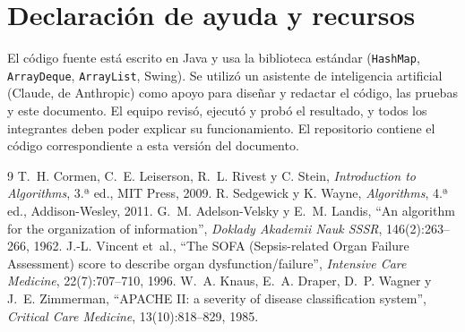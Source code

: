\documentclass[11pt,a4paper]{article}
\begin{document}
\section{Declaración de ayuda y recursos}
El código fuente está escrito en Java y usa la biblioteca estándar (\texttt{HashMap}, \texttt{ArrayDeque}, \texttt{ArrayList}, Swing). Se utilizó un asistente de inteligencia artificial (Claude, de Anthropic) como apoyo para diseñar y redactar el código, las pruebas y este documento. El equipo revisó, ejecutó y probó el resultado, y todos los integrantes deben poder explicar su funcionamiento. El repositorio contiene el código correspondiente a esta versión del documento.

\begin{thebibliography}{9}
 T.~H. Cormen, C.~E. Leiserson, R.~L. Rivest y C. Stein, \emph{Introduction to Algorithms}, 3.ª ed., MIT Press, 2009.
 R. Sedgewick y K. Wayne, \emph{Algorithms}, 4.ª ed., Addison-Wesley, 2011.
 G.~M. Adelson-Velsky y E.~M. Landis, ``An algorithm for the organization of information'', \emph{Doklady Akademii Nauk SSSR}, 146(2):263--266, 1962.
 J.-L. Vincent et~al., ``The SOFA (Sepsis-related Organ Failure Assessment) score to describe organ dysfunction/failure'', \emph{Intensive Care Medicine}, 22(7):707--710, 1996.
 W.~A. Knaus, E.~A. Draper, D.~P. Wagner y J.~E. Zimmerman, ``APACHE II: a severity of disease classification system'', \emph{Critical Care Medicine}, 13(10):818--829, 1985.
\end{thebibliography}
\end{document}
